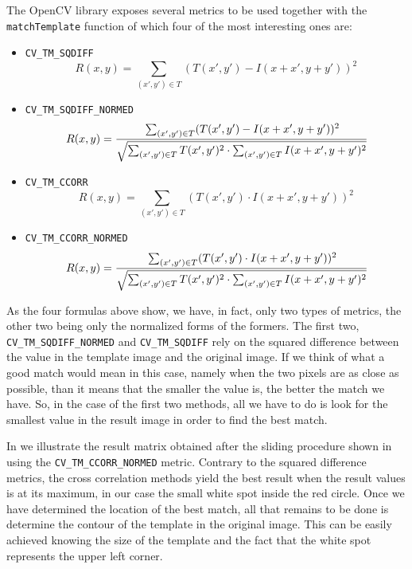 The OpenCV library exposes several metrics to be used together with the
\texttt{matchTemplate} function of which four of the most interesting ones are:
\begin{itemize}
  \item \texttt{CV_TM_SQDIFF}
    \[R(x, y) = \sum_{(x', y') \in T} (T(x', y') - I(x + x', y + y'))^2 \]
  \item \texttt{CV_TM_SQDIFF_NORMED}
    \[R(x, y) = \cfrac{\sum_{(x', y') \in T} (T(x', y') - I(x + x', y + y'))^2}
                     {\sqrt{\sum_{(x', y') \in T} T(x', y')^2 \cdot
                            \sum_{(x', y') \in T} I(x + x', y + y')^2}} \]
  \item \texttt{CV_TM_CCORR}
    \[R(x, y) = \sum_{(x', y') \in T} (T(x', y') \cdot I(x + x', y + y'))^2 \]
  \item \texttt{CV_TM_CCORR_NORMED}
    \[R(x, y) = \cfrac{\sum_{(x', y') \in T} (T(x', y') \cdot I(x + x', y + y'))^2}
                      {\sqrt{\sum_{(x', y') \in T} T(x', y')^2 \cdot
                             \sum_{(x', y') \in T} I(x + x', y + y')^2}} \]
\end{itemize}

As the four formulas above show, we have, in fact, only two types of metrics,
the other two being only the normalized forms of the formers. The first two,
\texttt{CV_TM_SQDIFF_NORMED} and \texttt{CV_TM_SQDIFF} rely on the squared
difference between the value in the template image and the original image. If
we think of what a good match would mean in this case, namely when the two
pixels are as close as possible, than it means that the smaller the value is,
the better the match we have. So, in the case of the first two methods, all we
have to do is look for the smallest value in the result image in order to
find the best match.


In  we illustrate the result matrix
obtained after the sliding procedure shown in
 using the
\texttt{CV_TM_CCORR_NORMED} metric. Contrary to the squared difference
metrics, the cross correlation methods yield the best result when the result
values is at its maximum, in our case the small white spot inside the red
circle. Once we have determined the location of the best match, all that
remains to be done is determine the contour of the template in the original
image. This can be easily achieved knowing the size of the template and the
fact that the white spot represents the upper left corner.

